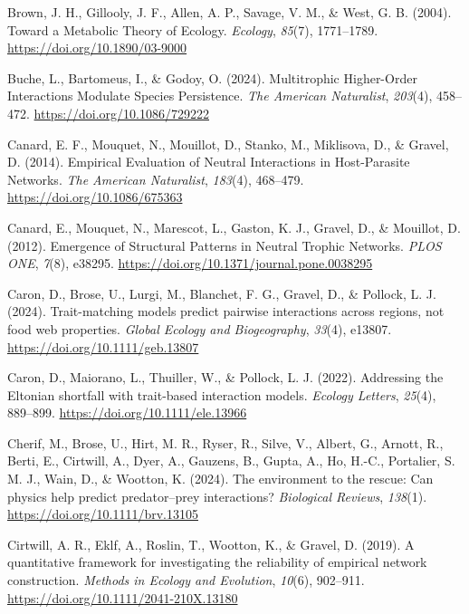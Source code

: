 \documentclass[
]{article}
\newlength{\cslhangindent}
\newenvironment{CSLReferences}[2] %
 {\begin{list}{}{%
  \setlength{\itemindent}{0pt}
  \setlength{\leftmargin}{0pt}
  \setlength{\parsep}{0pt}
  \ifodd #1
   \setlength{\leftmargin}{\cslhangindent}
   \setlength{\itemindent}{-1\cslhangindent}
  \fi
  \setlength{\itemsep}{#2\baselineskip}}}
 {\end{list}}
\begin{document}
\begin{CSLReferences}{1}{0}
Brown, J. H., Gillooly, J. F., Allen, A. P., Savage, V. M., \& West, G.
B. (2004). Toward a {Metabolic Theory} of {Ecology}. \emph{Ecology},
\emph{85}(7), 1771--1789. \url{https://doi.org/10.1890/03-9000}

Buche, L., Bartomeus, I., \& Godoy, O. (2024). Multitrophic
{Higher-Order Interactions Modulate Species Persistence}. \emph{The
American Naturalist}, \emph{203}(4), 458--472.
\url{https://doi.org/10.1086/729222}

Canard, E. F., Mouquet, N., Mouillot, D., Stanko, M., Miklisova, D., \&
Gravel, D. (2014). Empirical {Evaluation} of {Neutral Interactions} in
{Host-Parasite Networks}. \emph{The American Naturalist}, \emph{183}(4),
468--479. \url{https://doi.org/10.1086/675363}

Canard, E., Mouquet, N., Marescot, L., Gaston, K. J., Gravel, D., \&
Mouillot, D. (2012). Emergence of {Structural Patterns} in {Neutral
Trophic Networks}. \emph{PLOS ONE}, \emph{7}(8), e38295.
\url{https://doi.org/10.1371/journal.pone.0038295}

Caron, D., Brose, U., Lurgi, M., Blanchet, F. G., Gravel, D., \&
Pollock, L. J. (2024). Trait-matching models predict pairwise
interactions across regions, not food web properties. \emph{Global
Ecology and Biogeography}, \emph{33}(4), e13807.
\url{https://doi.org/10.1111/geb.13807}

Caron, D., Maiorano, L., Thuiller, W., \& Pollock, L. J. (2022).
Addressing the {Eltonian} shortfall with trait-based interaction models.
\emph{Ecology Letters}, \emph{25}(4), 889--899.
\url{https://doi.org/10.1111/ele.13966}

Cherif, M., Brose, U., Hirt, M. R., Ryser, R., Silve, V., Albert, G.,
Arnott, R., Berti, E., Cirtwill, A., Dyer, A., Gauzens, B., Gupta, A.,
Ho, H.-C., Portalier, S. M. J., Wain, D., \& Wootton, K. (2024). The
environment to the rescue: Can physics help predict predator--prey
interactions? \emph{Biological Reviews}, \emph{138}(1).
\url{https://doi.org/10.1111/brv.13105}

Cirtwill, A. R., Eklf, A., Roslin, T., Wootton, K., \& Gravel, D.
(2019). A quantitative framework for investigating the reliability of
empirical network construction. \emph{Methods in Ecology and Evolution},
\emph{10}(6), 902--911. \url{https://doi.org/10.1111/2041-210X.13180}


\end{CSLReferences}
\end{document}
